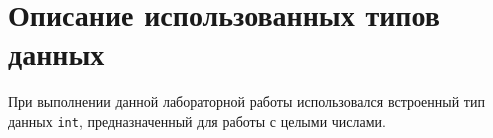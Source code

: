 \section{Описание использованных типов данных}

При выполнении данной лабораторной работы использовался
встроенный тип данных \texttt{int},
предназначенный для работы с целыми числами.
